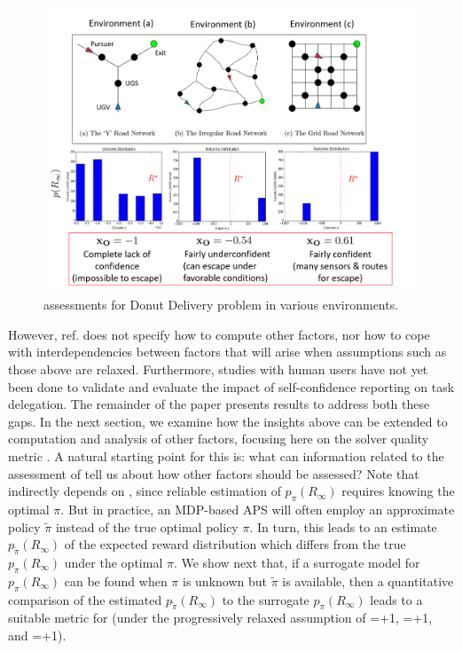     \begin{figure}[tbp]
        \centering
        \includegraphics[width=0.68\linewidth]{Figures/xO_envsOnly.png}
        \caption{\xO{} assessments for Donut Delivery problem in various environments.}
        \label{fig:xOexample}
    \end{figure}



However, ref. \cite{Aitken2016-cv} does not specify how to compute other factors, nor how to cope with interdependencies between factors that will arise when assumptions such as those above are relaxed. Furthermore, studies with human users have not yet been done to validate and evaluate the impact of self-confidence reporting on task delegation. The remainder of the paper presents results to address both these gaps. In the next section, we examine how the insights above can be extended to computation and analysis of other \famsec{} factors, focusing here on the solver quality metric \xQ{}. A natural starting point for this is: what can information related to the assessment of \xO{} tell us about how other factors should be assessed? Note that \xO{} indirectly depends on \xQ{}, since reliable estimation of $p_{\pi}(R_{\infty})$ requires knowing the optimal $\pi$. But in practice, an MDP-based APS will often employ an approximate policy $\tilde{\pi}$ instead of the true optimal policy $\pi$. In turn, this leads to an estimate $p_{\tilde{\pi}}(R_{\infty})$ of the expected reward distribution which differs from the true $p_{\pi}(R_{\infty})$ under the optimal $\pi$. We show next that, if a surrogate model for $p_{\pi}(R_{\infty})$ can be found when $\pi$ is unknown but $\tilde{\pi}$ is available, then a quantitative comparison of the estimated $p_{\tilde{\pi}}(R_{\infty})$ to the surrogate $p_{\pi}(R_{\infty})$ leads to a suitable metric for \xQ{} (under the progressively relaxed assumption of \xM{}=+1, \xP{}=+1, and \xI{}=+1). 

